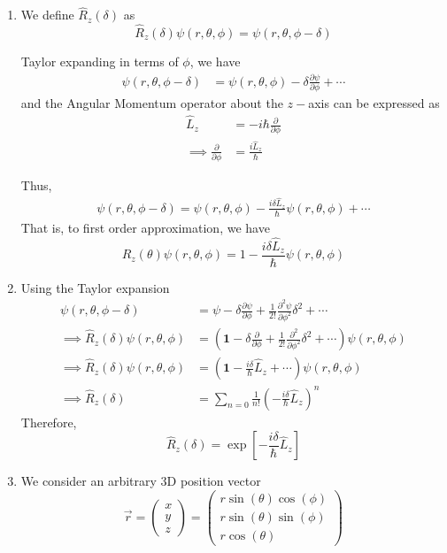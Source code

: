 \documentclass{article}
\begin{document}
\begin{enumerate}[label=(\alph*)]
  \item We define $\hat{R}_z(\delta)$ as 
  \[ \hat{R}_z (\delta) \psi(r, \theta, \phi) = \psi(r, \theta, \phi - \delta) \]
  
  Taylor expanding in terms of $\phi$, we have 
  \begin{align*}
    \psi(r, \theta, \phi - \delta) &= \psi(r, \theta, \phi) - \delta \frac{\partial \psi}{\partial \phi} + \cdots
  \end{align*}
  and the Angular Momentum operator about the $z-$axis can be expressed as 
  \begin{align*}
    \hat{L}_z &= -i\hbar \frac{\partial}{\partial \phi} \\
    \implies \frac{\partial}{\partial \phi} &= \frac{i\hat{L}_z}{\hbar}
  \end{align*}
  
  Thus, 
  \begin{align*}
    \psi(r, \theta, \phi - \delta) = \psi(r, \theta, \phi) - \frac{i\delta \hat{L}_z}{\hbar}\psi(r, \theta, \phi) + \cdots
  \end{align*}
  That is, to first order approximation, we have 
  \[ \boxed{\hat{R}_z(\theta) \psi(r, \theta, \phi) = 1 - \frac{i \delta \hat{L}_z}{\hbar} \psi(r, \theta, \phi)} \]

  \vskip 1cm
  \item Using the Taylor expansion
  \begin{align*}
    \psi(r, \theta, \phi - \delta) &= \psi - \delta \frac{\partial \psi}{\partial \phi} + \frac{1}{2!} \frac{\partial^2 \psi}{\partial \phi^2} \delta^2 + \cdots \\
    \implies \hat{R}_z(\delta) \psi(r, \theta, \phi) &= \left(\mathbf{1} - \delta \frac{\partial}{\partial \phi} + \frac{1}{2!} \frac{\partial^2}{\partial \phi^2} \delta^2 + \cdots  \right) \psi(r, \theta, \phi) \\
    \implies \hat{R}_z(\delta)\psi(r, \theta, \phi) &= \left( \mathbf{1} - \frac{i \delta}{\hbar}\hat{L}_z + \cdots \right) \psi(r, \theta, \phi) \\
    \implies \hat{R}_z(\delta) &=  \sum_{n = 0} \frac{1}{n!} \left(-\frac{i \delta}{\hbar} \hat{L}_z \right)^n 
  \end{align*}
  Therefore, 
  \[ \boxed{ \hat{R}_z(\delta) = \exp\left[ -\frac{i \delta}{\hbar} \hat{L}_z \right] } \]


  \vskip 1cm
  \item We consider an arbitrary 3D position vector 
  \begin{equation*}
    \vec{r} = 
  \begin{pmatrix}
    x \\
    y \\
    z
  \end{pmatrix} 
  = 
  \begin{pmatrix}
    r \sin(\theta) \cos(\phi) \\
    r \sin(\theta) \sin(\phi) \\
    r \cos(\theta) 
  \end{pmatrix} 
  \end{equation*}


\end{enumerate}
\end{document}
